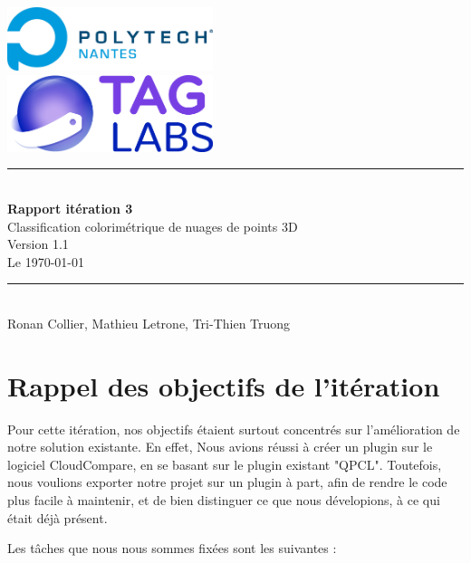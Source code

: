 \documentclass[12pt,titlepage,french]{article}
\begin{document}

\begin{titlepage}
\newcommand{\HRule}{\rule{\linewidth}{0.5mm}}
\center

  \includegraphics[width=0.45\textwidth]{../../ressources/img_logos/logo_polytech.png}\\[1cm]

  \includegraphics[width=0.45\textwidth]{../../ressources/img_logos/logo_taglabs.png}


\HRule \\[0.4cm]
{ \huge \bfseries Rapport itération 3\\[0.15cm] }
Classification colorimétrique de nuages de points 3D\\
Version 1.1\\
Le \today \\
\HRule \\[1.5cm]
Ronan Collier,
Mathieu Letrone,
Tri-Thien Truong
\\[1cm]
\end{titlepage}

\tableofcontents %
\newpage
\listoffigures  %
\newpage

\section{Rappel des objectifs de l'itération}
Pour cette itération, nos objectifs étaient surtout concentrés sur l'amélioration de notre solution existante. En effet, Nous avions réussi à créer un plugin sur le logiciel CloudCompare, en se basant sur le plugin existant "QPCL". Toutefois, nous voulions exporter notre projet sur un plugin à part, afin de rendre le code plus facile à maintenir, et de bien distinguer ce que nous dévelopions, à ce qui était déjà présent.

Les tâches que nous nous sommes fixées sont les suivantes :
\end{document}
